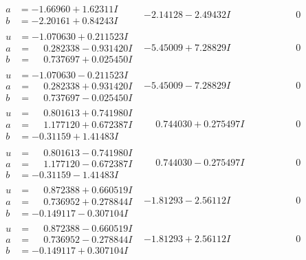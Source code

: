\documentclass[1p]{elsarticle_modified}
\theoremstyle{definition}
\begin{document}
$$\begin{array}{c|c|c}
\begin{aligned}
a &= -1.66960 + 1.62311 I \\
b &= -2.20161 + 0.84243 I\end{aligned}
 & -2.14128 - 2.49432 I & \phantom{-0.000000 } 0 \\ \hline\begin{aligned}
u &= -1.070630 + 0.211523 I \\
a &= \phantom{-}0.282338 - 0.931420 I \\
b &= \phantom{-}0.737697 + 0.025450 I\end{aligned}
 & -5.45009 + 7.28829 I & \phantom{-0.000000 } 0 \\ \hline\begin{aligned}
u &= -1.070630 - 0.211523 I \\
a &= \phantom{-}0.282338 + 0.931420 I \\
b &= \phantom{-}0.737697 - 0.025450 I\end{aligned}
 & -5.45009 - 7.28829 I & \phantom{-0.000000 } 0 \\ \hline\begin{aligned}
u &= \phantom{-}0.801613 + 0.741980 I \\
a &= \phantom{-}1.177120 + 0.672387 I \\
b &= -0.31159 + 1.41483 I\end{aligned}
 & \phantom{-}0.744030 + 0.275497 I & \phantom{-0.000000 } 0 \\ \hline\begin{aligned}
u &= \phantom{-}0.801613 - 0.741980 I \\
a &= \phantom{-}1.177120 - 0.672387 I \\
b &= -0.31159 - 1.41483 I\end{aligned}
 & \phantom{-}0.744030 - 0.275497 I & \phantom{-0.000000 } 0 \\ \hline\begin{aligned}
u &= \phantom{-}0.872388 + 0.660519 I \\
a &= \phantom{-}0.736952 + 0.278844 I \\
b &= -0.149117 - 0.307104 I\end{aligned}
 & -1.81293 - 2.56112 I & \phantom{-0.000000 } 0 \\ \hline\begin{aligned}
u &= \phantom{-}0.872388 - 0.660519 I \\
a &= \phantom{-}0.736952 - 0.278844 I \\
b &= -0.149117 + 0.307104 I\end{aligned}
 & -1.81293 + 2.56112 I & \phantom{-0.000000 } 0 \\ \hline\begin{aligned}

\end{aligned}
\end{array}$$
\end{document}
